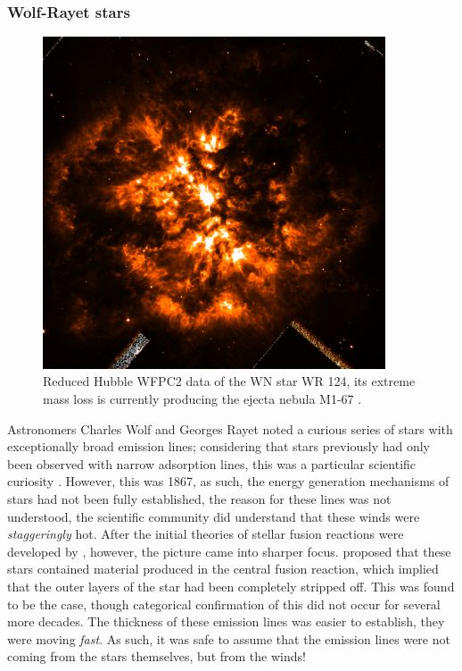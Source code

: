 \subsubsection{Wolf-Rayet stars}
\label{sec:wrtype}

\begin{figure}[h]
  \centering
  \includegraphics[width=4in]{assets/WR124.png}
  \caption[\textit{M1-67 nebula around WR 124 \parencite{2010ApJ...724L..90M}}]{Reduced Hubble WFPC2 data of the WN star WR 124, its extreme mass loss is currently producing the ejecta nebula M1-67 \parencite{2010ApJ...724L..90M}.}
  \label{fig:wr124}
\end{figure}


Astronomers Charles Wolf and Georges Rayet noted a curious series of stars with exceptionally broad emission lines; considering that stars previously had only been observed with narrow adsorption lines, this was a particular scientific curiosity
\parencite{crowther_physical_2007}.
However, this was 1867, as such, the energy generation mechanisms of stars had not been fully established, the reason for these lines was not understood, the scientific community did understand that these winds were \emph{staggeringly} hot.
After the initial theories of stellar fusion reactions were developed by \textcite{betheEnergyProductionStars1939}, however, the picture came into sharper focus.
\textcite{gamowWCWNStars1943} proposed that these stars contained material produced in the central fusion reaction, which implied that the outer layers of the star had been completely stripped off.
This was found to be the case, though categorical confirmation of this did not occur for several more decades.
The thickness of these emission lines was easier to establish, they were moving \emph{fast}.
As such, it was safe to assume that the emission lines were not coming from the stars themselves, but from the winds!

